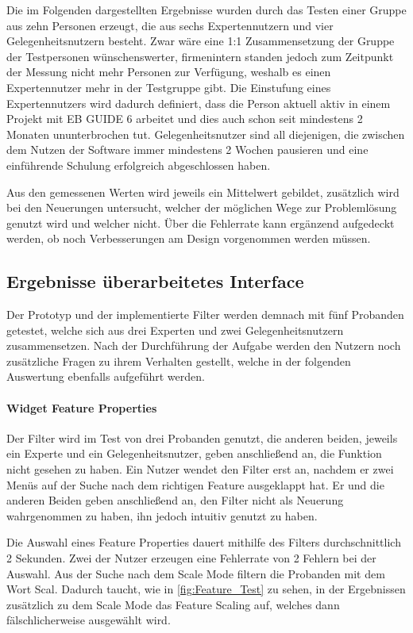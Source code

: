Die im Folgenden dargestellten Ergebnisse wurden durch das Testen einer Gruppe aus zehn Personen erzeugt, die aus sechs Expertennutzern und vier Gelegenheitsnutzern besteht.
Zwar wäre eine 1:1 Zusammensetzung der Gruppe der Testpersonen wünschenswerter, firmenintern standen jedoch zum Zeitpunkt der Messung nicht mehr Personen zur Verfügung, weshalb es einen Expertennutzer mehr in der Testgruppe gibt.
Die Einstufung eines Expertennutzers wird dadurch definiert, dass die Person aktuell aktiv in einem Projekt mit EB GUIDE 6 arbeitet und dies auch schon seit mindestens 2 Monaten ununterbrochen tut.
Gelegenheitsnutzer sind all diejenigen, die zwischen dem Nutzen der Software immer mindestens 2 Wochen pausieren und eine einführende Schulung erfolgreich abgeschlossen haben.

Aus den gemessenen Werten wird jeweils ein Mittelwert gebildet, zusätzlich wird bei den Neuerungen untersucht, welcher der möglichen Wege zur Problemlösung genutzt wird und welcher nicht.
Über die Fehlerrate kann ergänzend aufgedeckt werden, ob noch Verbesserungen am Design vorgenommen werden müssen.

\subsection{Ergebnisse überarbeitetes Interface}
Der Prototyp und der implementierte Filter werden demnach mit fünf Probanden getestet, welche sich aus drei Experten und zwei Gelegenheitsnutzern zusammensetzen.
Nach der Durchführung der Aufgabe werden den Nutzern noch zusätzliche Fragen zu ihrem Verhalten gestellt, welche in der folgenden Auswertung ebenfalls aufgeführt werden.

\paragraph{Widget Feature Properties}
Der Filter wird im Test von drei Probanden genutzt, die anderen beiden, jeweils ein Experte und ein Gelegenheitsnutzer, geben anschließend an, die Funktion nicht gesehen zu haben.
Ein Nutzer wendet den Filter erst an, nachdem er zwei Menüs auf der Suche nach dem richtigen Feature ausgeklappt hat.
Er und die anderen Beiden geben anschließend an, den Filter nicht als Neuerung wahrgenommen zu haben, ihn jedoch intuitiv genutzt zu haben.

Die Auswahl eines Feature Properties dauert mithilfe des Filters durchschnittlich 2 Sekunden.
Zwei der Nutzer erzeugen eine Fehlerrate von 2 Fehlern bei der Auswahl.
Aus der Suche nach dem Scale Mode filtern die Probanden mit dem Wort \glqq Scal\grqq{}.
Dadurch taucht, wie in \cref{fig:Feature_Test} zu sehen, in der Ergebnissen zusätzlich zu dem Scale Mode das Feature Scaling auf, welches dann fälschlicherweise ausgewählt wird.


